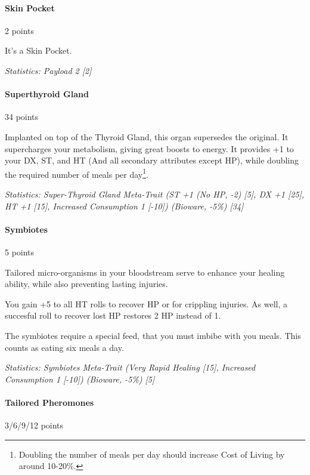 \begin{multicols*}{3}
	\paragraph{Skin Pocket}\label{skin_pocket}
	\begin{flushright}
		2 points
	\end{flushright}
	
	It's a Skin Pocket. 
	
	\textit{\textcolor{OliveGreen}{Statistics: Payload 2 [2]}}
	
	\paragraph{Superthyroid Gland}
	\begin{flushright}
		34 points
	\end{flushright}
	
	Implanted on top of the Thyroid Gland, this organ supersedes the original. It supercharges your metabolism, giving great boosts to energy. It provides +1 to your DX, ST, and HT (And all secondary attributes except HP), while doubling the required number of meals per day\footnote{Doubling the number of meals per day should increase Cost of Living by around 10-20\%.}.
	
	\textit{\textcolor{OliveGreen}{Statistics: Super-Thyroid Gland Meta-Trait (ST +1 (No HP, -2) [5], DX +1 [25], HT +1 [15], Increased Consumption 1 [-10]) (Bioware, -5\%) [34]}}
	
	\paragraph{Symbiotes}
	\begin{flushright}
		5 points
	\end{flushright}
	
	Tailored micro-organisms in your bloodstream serve to enhance your healing ability, while also preventing lasting injuries.
	
	You gain +5 to all HT rolls to recover HP or for crippling injuries. As well, a succesful roll to recover lost HP restores 2 HP instead of 1.
	
	The symbiotes require a special feed, that you must imbibe with you meals. This counts as eating six meals a day.
	
	\textit{\textcolor{OliveGreen}{Statistics: Symbiotes Meta-Trait (Very Rapid Healing [15], Increased Consumption 1 [-10]) (Bioware, -5\%) [5]}}
	
	\paragraph{Tailored Pheromones}
	\begin{flushright}
		3/6/9/12 points
	\end{flushright}
	

\end{multicols*}
